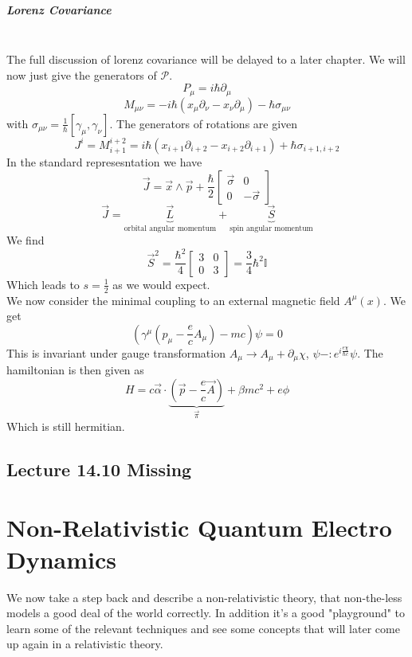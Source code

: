 \documentclass{report}
\begin{document}
\paragraph{Lorenz Covariance}\\
The full discussion of lorenz covariance will be delayed to a later chapter. We will now just give the generators of $\mathcal{P}$. \[
P_\mu = i\hbar \partial_\mu 
\] 
\[
  M_{\mu \nu} = -i\hbar \left( x_\mu \partial_\nu - x_\nu\partial_\mu   \right) - \hbar \sigma_{\mu \nu}
\] with $\sigma_{\mu \nu} = \frac{1}{\hbar} [\gamma_\mu, \gamma_\nu]$.
The generators of rotations are given \[
  J^i = M_{i+1}^{i+2} = i\hbar \left( x_{i+1} \partial_{i+2} - x_{i+2} \partial_{i+1}   \right) + \hbar \sigma_{i+1, i+2}
\] In the standard represesntation we have \[
\vec{J} = \vec{x} \wedge \vec{p} + \frac{\hbar}{2} \begin{bmatrix} \vec{\sigma} & 0 \\ 0 & -\vec{\sigma} \end{bmatrix} 
\] \[
\vec{J} = \underbrace{\vec{L}}_{\text{orbital angular momentum}} + \underbrace{\vec{S}}_{\text{spin angular momentum}}
\] We find \[
\vec{S}^2 = \frac{\hbar^2}{4} \begin{bmatrix} 3 & 0 \\ 0 & 3 \end{bmatrix} = \frac{3}{4} \hbar^2 \mathbb{I}
\] Which leads to $s = \frac{1}{2}$ as we would expect. \\
We now consider the minimal coupling to an external magnetic field $A^\mu\left( x \right) $. We get \[
  \left( \gamma^\mu \left( p_\mu - \frac{e}{c} A_\mu \right) - mc \right) \psi = 0
\] 
This is invariant under gauge transformation $A_\mu \to  A_\mu + \partial_\mu \chi $, $\psi -: e^{i \frac{e \chi}{\hbar c}} \psi$.
The hamiltonian is then given as  \[
  H = c \vec{\alpha} \cdot  \underbrace{\left( \vec{p} - \frac{e}{c} \vec{A} \right)}_{\vec{\pi}} + \beta mc^2 + e \phi
\] Which is still hermitian.
\section*{Lecture 14.10 Missing}
\chapter{Non-Relativistic Quantum Electro Dynamics}
We now take a step back and describe a non-relativistic theory, that non-the-less models a good deal of the world correctly. In addition it's a good "playground" to learn some of the relevant techniques and see some concepts that will later come up again in a relativistic theory.\\
\end{document}
